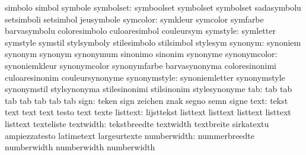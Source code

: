                           simbolo                   simbol
                           symbole
                symbolset: symboolset                symbolset
                           symbolset                 sadasymbolu
                           setsimboli                setsimbol
                           jeusymbole
                 symcolor: symkleur                  symcolor
                           symfarbe                  barvasymbolu
                           coloresimbolo             culoaresimbol
                           couleursym
                 symstyle: symletter                 symstyle
                           symstil                   stylsymboly
                           stilesimbolo              stilsimbol
                           stylesym
                  synonym: synoniem                  synonym
                           synonym                   synonymum
                           sinonimo                  sinonim
                           synonyme
             synonymcolor: synoniemkleur             synonymcolor
                           synonymfarbe              barvasynonyma
                           coloresinonimi            culoaresinonim
                           couleursynonyme
             synonymstyle: synoniemletter            synonymstyle
                           synonymstil               stylsynonyma
                           stilesinonimi             stilsinonim
                           stylesynonyme
                      tab: tab                       tab
                           tab                       tab
                           tab                       tab
                           tab
                     sign: teken                     sign
                           zeichen                   znak
                           segno                     semn
                           signe
                     text: tekst                     text
                           text                      text
                           testo                     text
                           texte
                 listtext: lijsttekst                listtext
                           listtext                  listtext
                           listtext                  listtext
                           texteliste
                textwidth: tekstbreedte              textwidth
                           textbreite                sirkatextu
                           ampiezzatesto             latimetext
                           largeurtexte
numberwidth: nummerbreedte numberwidth
             numberwidth   numberwidth
